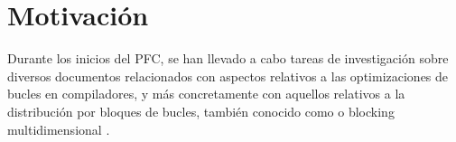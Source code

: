 %
%
%
%

\cleardoublepage
\chapter{Motivación} 
\label{chap:motivation}  


Durante los inicios del \ac{PFC}, se han llevado a cabo tareas de investigación sobre 
diversos documentos 
relacionados con aspectos relativos a las optimizaciones de bucles en compiladores, y más 
concretamente con aquellos relativos a la distribución por bloques de bucles, también 
conocido como \tiling{} o blocking multidimensional
\cite{Xue:2000:LTP,Wolfe:1987:IST,Andonov:1997:OOT}.
